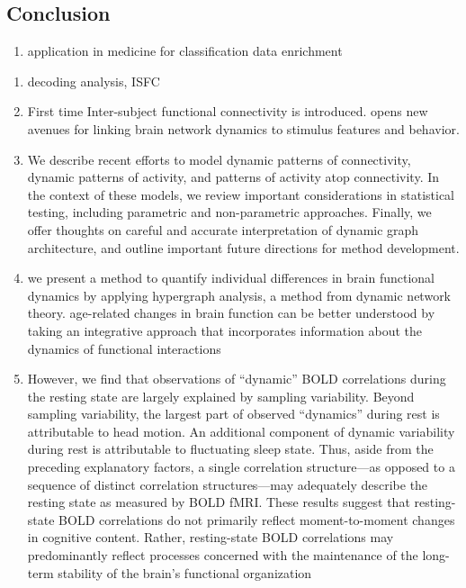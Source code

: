 \documentclass[12pt]{article}
\begin{document}
\subsection{Conclusion}
\begin{enumerate}
\item application in medicine for classification data enrichment
\end{enumerate}
\begin{enumerate}
\item \cite{jeremy2017} decoding analysis, ISFC
\item \cite{hasson2016} First time Inter-subject functional connectivity is introduced. opens new avenues for linking brain network dynamics to stimulus features and behavior.
\item \cite{khambhati2017} We describe recent efforts to model dynamic patterns of connectivity, dynamic patterns of activity, and patterns of activity atop connectivity. In the context of these models, we review important considerations in statistical testing, including parametric and non-parametric approaches. Finally, we offer thoughts on careful and accurate interpretation of dynamic graph architecture, and outline important future directions for method development.
\item \cite{davidson2016} we present a method to quantify individual differences in brain functional dynamics by applying hypergraph analysis, a method from dynamic network theory. age-related changes in brain function can be better understood by taking an integrative approach that incorporates information about the dynamics of functional interactions
\item \cite{peterson11} However, we find that observations of “dynamic” BOLD correlations during the resting state are largely explained by sampling variability. Beyond sampling variability, the largest part of observed “dynamics” during rest is attributable to head motion. An additional component of dynamic variability during rest is attributable to fluctuating sleep state. Thus, aside from the preceding explanatory factors, a single correlation structure—as opposed to a sequence of distinct correlation structures—may adequately describe the resting state as measured by BOLD fMRI. These results suggest that resting-state BOLD correlations do not primarily reflect moment-to-moment changes in cognitive content. Rather, resting-state BOLD correlations may predominantly reflect processes concerned with the maintenance of the long-term stability of the brain’s functional organization

\end{enumerate}
\end{document}
